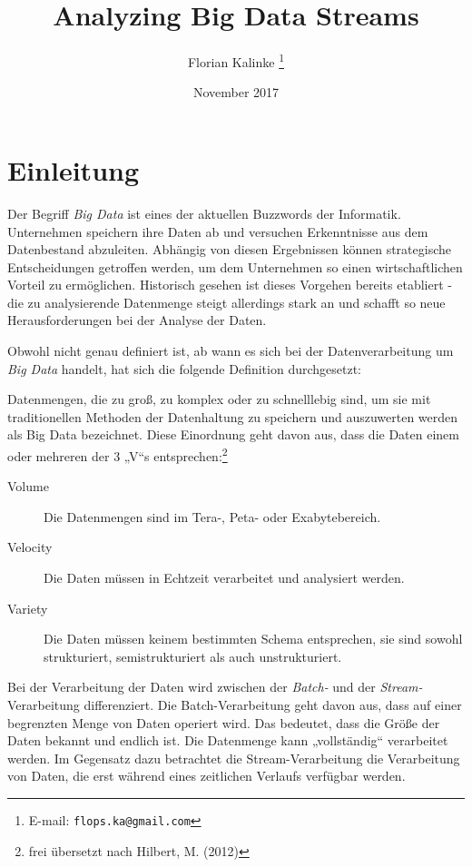 \documentclass[a4paper,11pt]{scrartcl}
\begin{document}
\title{Analyzing Big Data Streams}
\author{Florian Kalinke%
  \thanks{E-mail: \texttt{flops.ka@gmail.com}}}
  \date{November 2017}
  \maketitle


  \tableofcontents

  \newpage
  \section{Einleitung}
  Der Begriff \textit{Big Data} ist eines der aktuellen Buzzwords der Informatik.
  Unternehmen speichern ihre Daten ab und versuchen Erkenntnisse aus dem
  Datenbestand abzuleiten. Abhängig von diesen Ergebnissen können strategische
  Entscheidungen getroffen werden, um dem Unternehmen so einen wirtschaftlichen
  Vorteil zu ermöglichen. Historisch gesehen ist dieses Vorgehen bereits
  etabliert - die zu analysierende Datenmenge steigt allerdings stark an und
  schafft so neue Herausforderungen bei der Analyse der
  Daten.\cite[S.~1]{freiknecht2014}

  Obwohl nicht genau definiert ist, ab wann es sich bei der Datenverarbeitung um
  \textit{Big Data} handelt, hat sich die folgende Definition durchgesetzt:

  Datenmengen, die zu groß, zu komplex oder zu schnelllebig sind, um sie mit
  traditionellen Methoden der Datenhaltung zu speichern und auszuwerten werden
  als Big Data bezeichnet. Diese Einordnung geht davon aus, dass die Daten einem
  oder mehreren der 3 „V“s entsprechen:\footnote{frei übersetzt nach Hilbert,
  M. (2012)}
  \begin{description}
    \item[Volume] Die Datenmengen sind im Tera-, Peta- oder Exabytebereich.
    \item[Velocity] Die Daten müssen in Echtzeit verarbeitet und analysiert
      werden.
    \item[Variety] Die Daten müssen keinem bestimmten Schema entsprechen, sie
      sind sowohl strukturiert, semistrukturiert als auch unstrukturiert.
  \end{description}

  Bei der Verarbeitung der Daten wird zwischen der \textit{Batch-} und der
  \textit{Stream-}Verarbeitung differenziert. Die Batch-Verarbeitung geht davon
  aus, dass auf einer begrenzten Menge von Daten operiert wird. Das bedeutet,
  dass die Größe der Daten bekannt und endlich ist. Die Datenmenge kann
  „vollständig“ verarbeitet werden. Im Gegensatz dazu betrachtet die
  Stream-Verarbeitung die Verarbeitung von Daten, die erst während eines
  zeitlichen Verlaufs verfügbar werden.\cite[S.~439]{kleppmann17}
\end{document}

